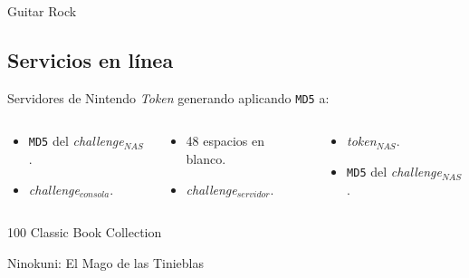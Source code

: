\begin{frame}{Guitar Rock}

\end{frame}


\subsection{Servicios en línea}
\begin{frame}{Servidores de Nintendo}
\textit{Token} generando aplicando \texttt{MD5} a:
\begin{columns}

\begin{column}{0.33\textwidth}\begin{itemize}
    \item \texttt{MD5} del \textit{challenge}$_{NAS}$.
    \item \textit{challenge}$_{consola}$.
\end{itemize}\end{column}

\begin{column}{0.33\textwidth}\begin{itemize}
    \item 48 espacios en blanco.
    \item \textit{challenge}$_{servidor}$.
\end{itemize}\end{column}

\begin{column}{0.33\textwidth}\begin{itemize}
    \item \textit{token}$_{NAS}$.
    \item \texttt{MD5} del \textit{challenge}$_{NAS}$.
\end{itemize}\end{column}

\end{columns}
\end{frame}

\begin{frame}{100 Classic Book Collection}

\end{frame}

\begin{frame}{Ninokuni: El Mago de las Tinieblas}

\end{frame}
